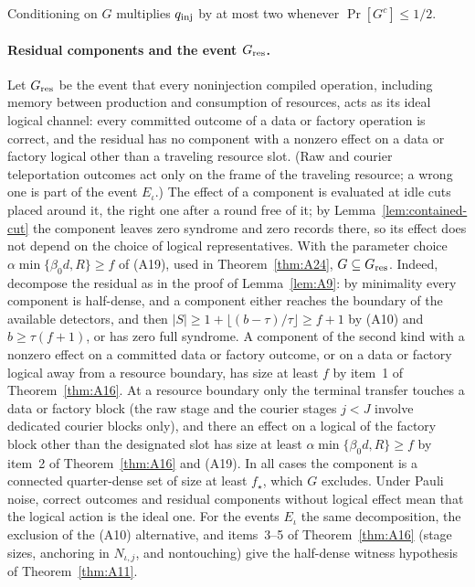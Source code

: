 \documentclass[aps,prx,reprint,superscriptaddress,nofootinbib,floatfix,longbibliography]{revtex4-2}
\theoremstyle{definition}
\begin{document}
Conditioning on $G$ multiplies $q_{\rm inj}$ by at most two whenever
$\Pr[G^c]\leq1/2$.

\paragraph{Residual components and the event $G_{\rm res}$.}
Let $G_{\rm res}$ be the event that every noninjection compiled operation,
including memory between production and consumption of resources, acts as
its ideal logical channel: every committed outcome of a data or factory
operation is correct, and the residual has no component with a nonzero
effect on a data or factory logical other than a traveling resource slot.
(Raw and courier teleportation outcomes act only on the frame of the
traveling resource; a wrong one is part of the event $E_\iota$.)  The
effect of a component is evaluated at idle cuts placed around it, the right
one after a round free of it; by Lemma~\ref{lem:contained-cut} the component
leaves zero syndrome and zero records there, so its effect does not depend on
the choice of logical representatives.  With the parameter choice
$\alpha\min\{\beta_0d,R\}\ge f$ of (A19), used in Theorem~\ref{thm:A24},
$G\subseteq G_{\rm res}$.  Indeed, decompose the residual as in the proof of
Lemma~\ref{lem:A9}: by minimality every component is half-dense, and a
component either reaches the boundary of the available detectors, and then
$|S|\ge1+\lfloor(b-\tau)/\tau\rfloor\ge f+1$ by (A10) and $b\ge\tau(f+1)$, or
has zero full syndrome.  A component of the second kind with a nonzero effect
on a committed data or factory outcome, or on a data or factory logical away
from a resource boundary, has size at least $f$ by item~1 of
Theorem~\ref{thm:A16}.  At a resource boundary only the terminal transfer
touches a data or factory block (the raw stage and the courier stages $j<J$
involve dedicated courier blocks only), and there an effect on a logical of
the factory block other than the designated slot has size at least
$\alpha\min\{\beta_0d,R\}\ge f$ by item~2 of Theorem~\ref{thm:A16} and (A19).  In all
cases the component is a connected quarter-dense set of size at least
$f_\star$, which $G$ excludes.  Under Pauli noise, correct outcomes and
residual components without logical effect mean that the logical action is
the ideal one.  For the events $E_\iota$ the same decomposition, the
exclusion of the (A10) alternative, and items~3--5 of Theorem~\ref{thm:A16}
(stage sizes, anchoring in $N_{\iota,j}$, and nontouching) give the
half-dense witness hypothesis of Theorem~\ref{thm:A11}.
\end{document}
